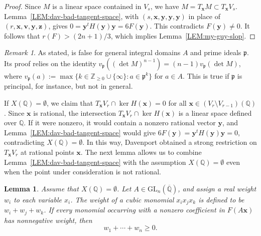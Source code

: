 \documentclass[a4paper,11pt, twoside,reqno]{amsart}
\theoremstyle{plain}
\newtheorem{lemma}[thm]{Lemma}
\theoremstyle{definition}
\theoremstyle{remark}
\newtheorem{rem}[thm]{Remark}
\newcommand{\bfv}{\bm{v}}
\newcommand{\bfx}{\bm{x}}
\newcommand{\bfy}{\bm{y}}
\newcommand{\bfz}{\bm{z}}
\newcommand{\ZZ}{\mathbb{Z}}
\newcommand{\QQ}{\mathbb{Q}}
\renewcommand{\ge}{\geqslant}
\renewcommand{\geq}{\geqslant}
\newcommand{\Qbar}{\overline{\mathbb{Q}}}
\numberwithin{equation}{section}
\begin{document}
\begin{proof}
Since $M$ is a linear space contained in $V_s$,
we have $M = T_{\bfx} M \subset T_{\bfx} V_s$.
Lemma~\ref{LEM:dav-bad-tangent-space},
with $(s,\bfx,\bfy,\bfy,\bfy)$ in place of $(r,\bfx,\bfv,\bfy,\bfz)$,
gives $0 = \bfy^t H(\bfy) \bfy = 6F(\bfy)$.
This contradicts $F(\bfy)\ne 0$.
It follows that $r(F) > (2n+1)/3$,
which implies Lemma~\ref{LEM:my-guy-slop}.
\end{proof}

\begin{rem}
As stated,
\cite[Proposition~4.3]{myguyzak}
is false for general integral domains $A$ and prime ideals $\mathfrak p$.
Its proof relies on the identity $v_{\mathfrak p}((\det M)^{n-1}) = (n-1)v_{\mathfrak p}(\det M)$, where $v_{\mathfrak p}(a) := \max\{k\in \ZZ_{\ge 0} \cup \{\infty\}: a\in \mathfrak p^k\}$ for $a\in A$.
This is true if $\mathfrak p$ is principal, for instance,
but not in general.
\end{rem}

If $X(\QQ)=\emptyset$, 
we claim that  $T_{\bfx}V_r \cap \ker H(\bfx) = 0$
for all $\bfx\in (V_r \setminus V_{r-1})(\QQ)$.
Since $\bfx$ is rational, the intersection $T_{\bfx}V_r\cap\ker H(\bfx)$ is a linear space defined over $\QQ$. If it were nonzero, it would contain a nonzero rational vector $\bfy$, and 
 Lemma~\ref{LEM:dav-bad-tangent-space}
would give \(6F(\bfy)=\bfy^tH(\bfy)\bfy=0\), contradicting \(X(\QQ)=\emptyset\).
In this way, Davenport obtained a strong restriction on $T_{\bfx}V_r$
at rational points $\bfx$. The next lemma allows us to combine
Lemma~\ref{LEM:dav-bad-tangent-space} with the assumption
$X(\QQ)=\emptyset$ even when the point under consideration
is not rational.




\begin{lemma}
\label{LEM:no-slop}
Assume that $X(\QQ)=\emptyset$.
Let $A\in\mathrm{GL}_n(\Qbar)$, and assign a real
weight $w_i$ to each variable $x_i$. The weight of a cubic monomial
$x_i x_j x_k$ is defined to be $w_i+w_j+w_k$. 
If every monomial occurring with a nonzero coefficient in
$F(A\bfx)$ has nonnegative weight, then
\begin{equation}
\label{EQ:mean-weight}
w_1+\cdots+w_n\geq 0.
\end{equation}
\end{lemma}
\end{document}
